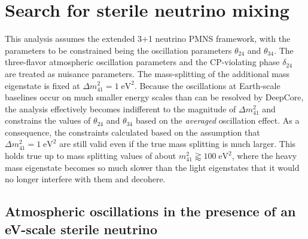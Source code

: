 \chapter{Search for sterile neutrino mixing}
\setchapterpreamble[u]{\margintoc}
\label{ch:measurement-sterile}

This analysis assumes the extended 3+1 neutrino PMNS framework, with the parameters to be constrained being the oscillation parameters $\theta_{24}$ and $\theta_{34}$.
The three-flavor atmospheric oscillation parameters and the CP-violating phase $\delta_{24}$ are treated as nuisance parameters.
The mass-splitting of the additional mass eigenstate is fixed at $\Delta m^2_{41}=1\;\mathrm{eV^2}$.
Because the oscillations at Earth-scale baselines occur on much smaller energy scales than can be resolved by DeepCore, the analysis effectively becomes indifferent to the magnitude of $\Delta m^2_{41}$ and constrains the values of $\theta_{24}$ and $\theta_{34}$ based on the \emph{averaged} oscillation effect.
As a consequence, the constraints calculated based on the assumption that $\Delta m^2_{41}=1\;\mathrm{eV^2}$ are still valid even if the true mass splitting is much larger.
This holds true up to mass splitting values of about $m^2_{41}\gtrapprox100\;\mathrm{eV^2}$, where the heavy mass eigenstate becomes so much slower than the light eigenstates that it would no longer interfere with them and decohere\cite{atmo_decoherence}.

\section{Atmospheric oscillations in the presence of an eV-scale sterile neutrino}

